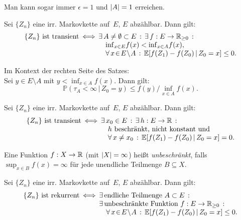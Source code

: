 \documentclass{cheat-sheet}
\renewcommand{\P}{\mathbb{P}} %
\newcommand{\E}{\mathbb{E}} %
\begin{document}
\begin{bem}
  Man kann sogar immer $\epsilon = 1$ und $\lvert A\rvert = 1$ erreichen.
\end{bem}


\begin{satz}
  Sei $\{ Z_n \}$ eine irr. Markovkette auf~$E$, $E$ abzählbar.
  Dann gilt:
  \[
    \arraycolsep=1pt
    \begin{array}{r c l}
      \{ Z_n \} \text{ ist transient}
      &\iff&
      \ex{A \neq \emptyset \subset E} \ex{f : E \to \R_{\geq 0}} \\
      && \quad {\inf}_{x \in E} f(x) < {\inf}_{x \in A} f(x), \\
      && \quad \fa{x \!\in\! E \!\setminus\! A} \E[ f(Z_1) - f(Z_0) \,|\, Z_0 = x ] \leq 0.
    \end{array}
  \]
\end{satz}

\begin{lem}
  \begin{minipage}[t]{0.8 \linewidth}
    Im Kontext der rechten Seite des Satzes: \\
    Sei $y \in E \setminus A$ mit $y < {\inf}_{x \in A} f(x)$.
    Dann gilt:
    \[
      \P(\tau_A < \infty \,|\, Z_0 = y) \leq f(y) / {\inf}_{x \in A} f(x).
    \]
  \end{minipage}
\end{lem}

\begin{kor}
  Sei $\{ Z_n \}$ eine irr. Markovkette auf~$E$, $E$ abzählbar.
  Dann gilt:
  \[
    \arraycolsep=1pt
    \begin{array}{r c l}
      \{ Z_n \} \text{ ist transient}
      &\iff&
      \ex{x_0 \in E} \ex{h : E \to \R} \\
      && \quad \text{$h$ beschränkt, nicht konstant und} \\
      && \quad \fa{x \neq x_0} \E[ f(Z_1) - f(Z_0) \,|\, Z_0 = x ] = 0.
    \end{array}
  \]
\end{kor}

\begin{defn}
  Eine Funktion $f : X \to \mathbb{R}$ (mit $\lvert X\rvert = \infty$) heißt \emph{unbeschränkt}, falls ${\sup}_{x \in B} f(x) = \infty$ für jede unendliche Teilmenge $B \subseteq X$.
\end{defn}

\begin{satz}
  Sei $\{ Z_n \}$ eine irr. Markovkette auf~$E$, $E$ abzählbar.
  Dann gilt:
  \[
    \arraycolsep=1pt
    \begin{array}{r c l}
      \{ Z_n \} \text{ ist rekurrent}
      &\iff&
      \ex{\text{endliche Teilmenge } A \subset E} \\
      && \ex{\text{unbeschränkte Funktion } f : E \to \R_{\geq 0}} \\
      && \quad \fa{x \!\in\! E \!\setminus\! A} \E[ f(Z_1) - f(Z_0) \,|\, Z_0 = x ] \leq 0.
    \end{array}
  \]
\end{satz}
\end{document}
